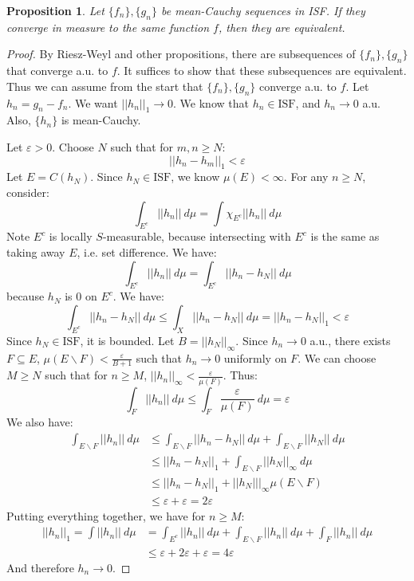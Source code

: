 \documentclass[a4paper,12pt]{report}
\newcommand{\varep}{ \varepsilon }
\newcommand{\sse} {\subseteq}
\newtheorem{prop}[theorem]{Proposition}
\begin{document}
	\begin{prop}
	Let $\{f_n\}, \{g_n\}$ be mean-Cauchy sequences in ISF. If they converge in measure to the same function $f$, then they are equivalent. 
	\end{prop}
	\begin{proof}
	By Riesz-Weyl and other propositions, there are subsequences of $\{f_n\}, \{g_n\}$ that converge a.u. to $f$. It suffices to show that these subsequences are equivalent. Thus we can assume from the start that $\{f_n\}, \{g_n\}$ converge a.u. to $f$. Let $h_n = g_n - f_n$. We want $||h_n||_1 \rightarrow 0$. We know that $h_n \in \text{ISF}$, and $h_n \rightarrow 0$ a.u. Also, $\{h_n\}$ is mean-Cauchy. 
	
	Let $\varep > 0$. Choose $N$ such that for $m, n \geq N$:
	\[ ||h_n - h_m||_1 < \varep \]
	Let $E = C(h_N)$. Since $h_N \in \text{ISF}$, we know $\mu(E) < \infty$. 
	For any $n \geq N$, consider:
	\[ \int_{E^c} ||h_n|| ~ d\mu = \int \chi_{E^c} ||h_n|| ~ d\mu \]
	Note $E^c$ is locally $S$-measurable, because intersecting with $E^c$ is the same as taking away $E$, i.e. set difference. We have:
	\[ \int_{E^c} ||h_n|| ~ d\mu = \int_{E^c} ||h_n - h_N|| ~ d\mu \]
	because $h_N$ is 0 on $E^c$. We have:
	\[ \int_{E^c} ||h_n - h_N|| ~ d\mu \leq \int_X ||h_n - h_N|| ~ d\mu = ||h_n - h_N||_1 < \varep \]
	Since $h_N \in \text{ISF}$, it is bounded. Let $B = ||h_N||_\infty$. Since $h_n \rightarrow 0$ a.u., there exists $F \sse E$, $\mu(E \backslash F) < \frac{\varep}{B + 1}$ such that $h_n \rightarrow 0$ uniformly on $F$. We can choose $M \geq N$ such that for $n \geq M$, $||h_n||_\infty < \frac{\varep}{\mu(F)}$. Thus:
	\[ \int_F ||h_n|| ~ d\mu \leq \int_F \frac{\varep}{\mu(F)} ~ d\mu = \varep \]
	We also have:
	\begin{align*}
	\int_{E \backslash F} ||h_n|| ~ d\mu &\leq \int_{E \backslash F} ||h_n - h_N|| ~ d\mu + \int_{E \backslash F} ||h_N|| ~ d\mu \\
	&\leq ||h_n - h_N||_1 + \int_{E \backslash F} ||h_N||_\infty ~ d\mu \\
	&\leq ||h_n - h_N||_1 + ||h_N|||_\infty \mu(E \backslash F) \\
	&\leq \varep + \varep = 2 \varep
	\end{align*}
	Putting everything together, we have for $n \geq M$:
	\begin{align*}
	||h_n||_1 = \int ||h_n|| ~ d\mu &= \int_{E^c} ||h_n|| ~ d\mu + \int_{E \backslash F} ||h_n|| ~ d\mu + \int_F ||h_n|| ~ d\mu \\
	&\leq \varep + 2\varep + \varep = 4 \varep
	\end{align*}
	And therefore $h_n \rightarrow 0$. 
	\end{proof}
	
\end{document}
